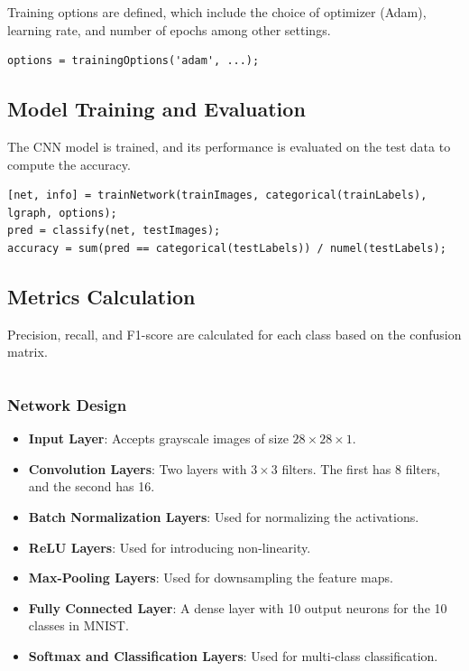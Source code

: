 Training options are defined, which include the choice of optimizer (Adam), learning rate, and number of epochs among other settings.

\begin{lstlisting}[style=Matlab-editor]
options = trainingOptions('adam', ...);
\end{lstlisting}

\subsection{Model Training and Evaluation}

The CNN model is trained, and its performance is evaluated on the test data to compute the accuracy.

\begin{lstlisting}[style=Matlab-editor]
[net, info] = trainNetwork(trainImages, categorical(trainLabels), lgraph, options);
pred = classify(net, testImages);
accuracy = sum(pred == categorical(testLabels)) / numel(testLabels);
\end{lstlisting}

\subsection{Metrics Calculation}

Precision, recall, and F1-score are calculated for each class based on the confusion matrix.

\begin{lstlisting}[style=Matlab-editor]
% Calculate precision, recall, and F1-score
\end{lstlisting}

\subsubsection{Network Design}

\begin{itemize}
    \item \textbf{Input Layer}: Accepts grayscale images of size \(28 \times 28 \times 1\).
    \item \textbf{Convolution Layers}: Two layers with \(3 \times 3\) filters. The first has 8 filters, and the second has 16.
    \item \textbf{Batch Normalization Layers}: Used for normalizing the activations.
    \item \textbf{ReLU Layers}: Used for introducing non-linearity.
    \item \textbf{Max-Pooling Layers}: Used for downsampling the feature maps.
    \item \textbf{Fully Connected Layer}: A dense layer with 10 output neurons for the 10 classes in MNIST.
    \item \textbf{Softmax and Classification Layers}: Used for multi-class classification.
\end{itemize}
\pagebreak
